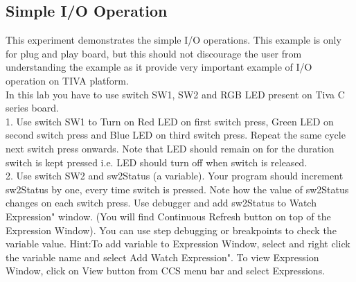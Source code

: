 \documentclass[a4paper,12pt,oneside]{article}
\begin{document}
		\subsection{\huge \textbf{Simple I/O Operation}}		
			{This experiment demonstrates the simple I/O operations.
			This example is only for plug and play board, but this should not discourage
			the user from understanding the example as it provide very important example of I/O operation 
			on TIVA platform.\\
			In this lab you have to use switch SW1, SW2 and RGB LED present on Tiva C series board.\\
			1. Use switch SW1 to Turn on Red LED on first switch press, Green LED on second
			switch press and Blue LED on third switch press. Repeat the same cycle next switch
			press onwards. Note that LED should remain on for the duration switch is kept pressed
			i.e. LED should turn off when switch is released.\\
			2. Use switch SW2 and sw2Status (a variable). Your program should increment sw2Status
			by one, every time switch is pressed. Note how the value of sw2Status changes on each
			switch press. Use debugger and add sw2Status to  Watch Expression" 	window.
			(You will find Continuous Refresh button on top of the Expression 	Window). You can
			use step debugging or breakpoints to check the variable value.
			Hint:To add variable to Expression Window, select and right click the variable name
			and select  Add Watch Expression". To view Expression Window, click on View button from CCS menu bar and select Expressions.}
			
\end{document}

